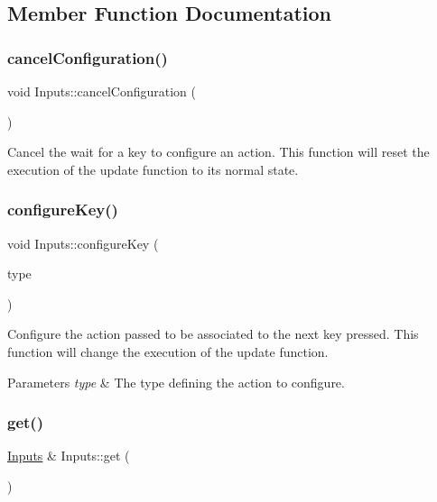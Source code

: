 \subsection{Member Function Documentation}
\mbox{\label{class_inputs_aff002b44212b7ba7ba44adeb17375185}} 
\subsubsection{\texorpdfstring{cancel\+Configuration()}{cancelConfiguration()}}
{\footnotesize\ttfamily void Inputs\+::cancel\+Configuration (\begin{DoxyParamCaption}{ }\end{DoxyParamCaption})\hspace{0.3cm}{\ttfamily [static]}}

Cancel the wait for a key to configure an action. This function will reset the execution of the update function to its normal state. \mbox{\label{class_inputs_a61cc1d165b796b3be516d2fd083cc646}} 
\subsubsection{\texorpdfstring{configure\+Key()}{configureKey()}}
{\footnotesize\ttfamily void Inputs\+::configure\+Key (\begin{DoxyParamCaption}\item[{Input\+Type\+::\+Enum}]{type }\end{DoxyParamCaption})\hspace{0.3cm}{\ttfamily [static]}}

Configure the action passed to be associated to the next key pressed. This function will change the execution of the update function.


\begin{DoxyParams}{Parameters}
{\em type} & The type defining the action to configure. \\
\hline
\end{DoxyParams}
\mbox{\label{class_inputs_afd9be7af3b695c51e3f8449e08a5e970}} 
\subsubsection{\texorpdfstring{get()}{get()}}
{\footnotesize\ttfamily \hyperlink{class_inputs}{Inputs} \& Inputs\+::get (\begin{DoxyParamCaption}{ }\end{DoxyParamCaption})\hspace{0.3cm}{\ttfamily [static]}}

